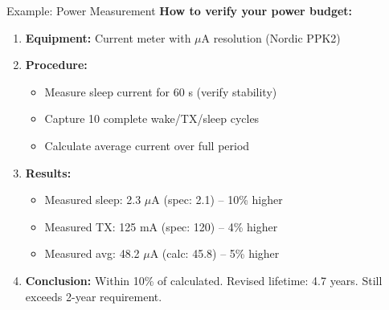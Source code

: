 \documentclass[aspectratio=169,11pt]{beamer}
\begin{document}
\begin{frame}{Example: Power Measurement}
    \textbf{How to verify your power budget:}
    
    \vspace{0.3cm}
    \begin{enumerate}
        \item \textbf{Equipment:} Current meter with $\mu$A resolution (Nordic PPK2)
        \item \textbf{Procedure:}
        \begin{itemize}
            \item Measure sleep current for 60 s (verify stability)
            \item Capture 10 complete wake/TX/sleep cycles
            \item Calculate average current over full period
        \end{itemize}
        \item \textbf{Results:}
        \begin{itemize}
            \item Measured sleep: 2.3 $\mu$A (spec: 2.1) -- 10\% higher
            \item Measured TX: 125 mA (spec: 120) -- 4\% higher
            \item Measured avg: 48.2 $\mu$A (calc: 45.8) -- 5\% higher
        \end{itemize}
        \item \textbf{Conclusion:} Within 10\% of calculated. Revised lifetime: 4.7 years. Still exceeds 2-year requirement.
    \end{enumerate}
\end{frame}
\end{document}
